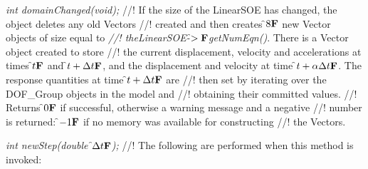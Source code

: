 {\em int domainChanged(void);}
//! If the size of the LinearSOE has changed, the object deletes any old Vectors
//! created and then creates \f$8{\bf F}$ new Vector objects of size equal to {\em
//! theLinearSOE-\f$>{\bf F}$getNumEqn()}. There is a Vector object created to store
//! the current displacement, velocity and accelerations at times \f$t{\bf F}$ and
\f$t + \Delta t{\bf F}$, and the displacement and velocity at time \f$t + \alpha
\Delta t{\bf F}$. The response quantities at time \f$t + \Delta t{\bf F}$ are
//! then set by iterating over the DOF\_Group objects in the model and
//! obtaining their committed values. 
//! Returns \f$0{\bf F}$ if successful, otherwise a warning message and a negative
//! number is returned: \f$-1{\bf F}$ if no memory was available for constructing
//! the Vectors.


{\em int newStep(double \f$\Delta t{\bf F}$);}
//! The following are performed when this method is invoked:

